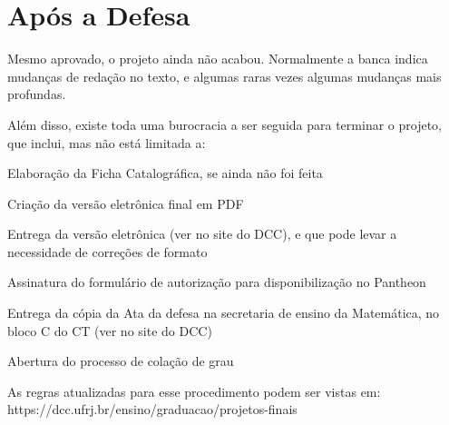 


\chapter{Após a Defesa}

Mesmo aprovado, o projeto ainda não acabou. Normalmente a banca indica mudanças de redação no texto, e algumas raras vezes algumas mudanças mais profundas.

Além disso, existe toda uma burocracia a ser seguida para terminar o projeto, que inclui, mas não está limitada a:

Elaboração da Ficha Catalográfica, se ainda não foi feita

Criação da versão eletrônica final em PDF

Entrega da versão eletrônica (ver no site do DCC), e que pode levar a necessidade de correções de formato

Assinatura do formulário de autorização para disponibilização no Pantheon

Entrega da cópia da Ata da defesa na secretaria de ensino da Matemática, no bloco C do CT (ver no site do DCC)

Abertura do processo de colação de grau

As regras atualizadas para esse procedimento podem ser vistas em:
https://dcc.ufrj.br/ensino/graduacao/projetos-finais
